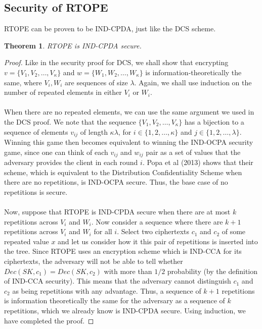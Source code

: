 \documentclass[12pt]{article}
\newtheorem{theorem}{Theorem}
\begin{document}
  \subsection{Security of RTOPE}

  RTOPE can be proven to be IND-CPDA, just like the DCS scheme.
  \begin{theorem}
    RTOPE is IND-CPDA secure.
  \end{theorem}
  \begin{proof}
    Like in the security proof for DCS, we shall show that encrypting $v = \{V_1, V_2, \ldots, V_{\kappa} \}$ and $w = \{W_1, W_2, \ldots, W_{\kappa}\}$ is information-theoretically the same, where $V_i, W_i$ are sequences of size $\lambda$. Again, we shall use induction on the number of repeated elements in either $V_i$ or $W_i$. \\ \\
When there are no repeated elements, we can use the same argument we used in the DCS proof. We note that the sequence $\{V_1, V_2, \ldots, V_{\kappa} \}$ has a bijection to a sequence of elements $v_{ij}$ of length $\kappa \lambda$, for $i \in \{1, 2, \ldots, \kappa\}$ and $j \in \{1, 2, \ldots, \lambda \}$. Winning this game then becomes equivalent to winning the IND-OCPA security game, since one can think of each $v_{ij}$ and $w_{ij}$ pair as a set of values that the adversary provides the client in each round $i$. Popa et al (2013) shows that their scheme, which is equivalent to the Distribution Confidentiality Scheme when there are no repetitions, is IND-OCPA secure. Thus, the base case of no repetitions is secure. \\ \\
Now, suppose that RTOPE is IND-CPDA secure when there are at most $k$ repetitions across $V_i$ and $W_i$. Now consider a sequence where there are $k+1$ repetitions across $V_i$ and $W_i$ for all $i$. Select two ciphertexts $c_1$ and $c_2$ of some repeated value $x$ and let us consider how it this pair of repetitions is inserted into the tree. Since RTOPE uses an encryption scheme which is IND-CCA for its ciphertexts, the adversary will not be able to tell whether $Dec(SK, c_1) = Dec(SK, c_2)$ with more than $1/2$ probability (by the definition of IND-CCA security). This means that the adversary cannot distinguish $c_1$ and $c_2$ as being repetitions with any advantage. Thus, a sequence of $k+1$ repetitions is information theoretically the same for the adversary as a sequence of $k$ repetitions, which we already know is IND-CPDA secure. Using induction, we have completed the proof.  
  \end{proof}
\end{document}

